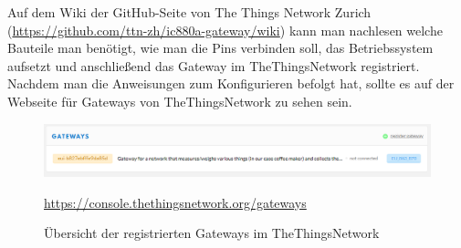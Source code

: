 Auf dem Wiki der GitHub-Seite von The Things Network Zurich (\url{https://github.com/ttn-zh/ic880a-gateway/wiki}) kann man nachlesen welche Bauteile man benötigt, wie man die Pins verbinden soll, das Betriebssystem aufsetzt und anschließend das Gateway im TheThingsNetwork registriert.\\
Nachdem man die Anweisungen zum Konfigurieren befolgt hat, sollte es auf der Webseite für Gateways von TheThingsNetwork zu sehen sein.
\begin{figure}[ht]
    \center
    \includegraphics[width=16cm]{Bilder/lora-1.png}\\
    \caption{Übersicht der registrierten Gateways im TheThingsNetwork}
    \begin{center} \quelle\url{https://console.thethingsnetwork.org/gateways} \end{center}
\end{figure}
\newpage
